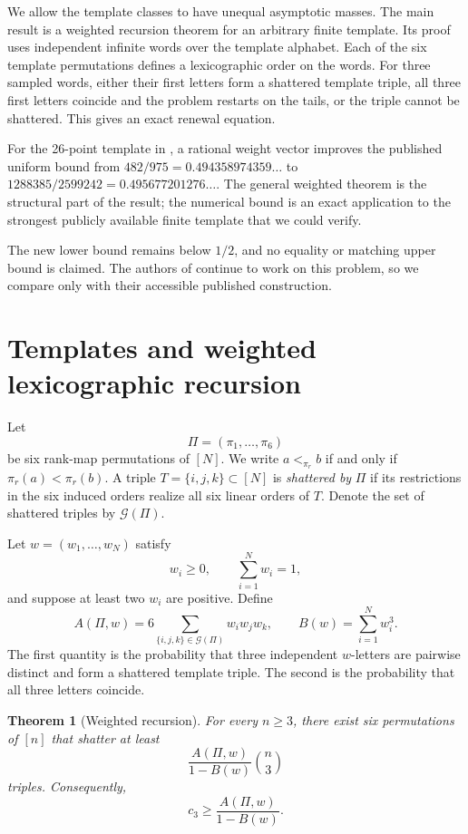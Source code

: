 \documentclass[11pt]{article}
\newtheorem{theorem}{Theorem}[section]
\newcommand{\shat}{\mathcal{G}}
\begin{document}
We allow the template classes to have unequal asymptotic masses.  The main
result is a weighted recursion theorem for an arbitrary finite template.  Its
proof uses independent infinite words over the template alphabet.  Each of
the six template permutations defines a lexicographic order on the words.
For three sampled words, either their first letters form a shattered template
triple, all three first letters coincide and the problem restarts on the
tails, or the triple cannot be shattered.  This gives an exact renewal
equation.

For the 26-point template in \cite{cerna-kielak-volec}, a rational weight
vector improves the published uniform bound from
$482/975=0.494358974359\ldots$ to
$1288385/2599242=0.495677201276\ldots$.  The general weighted theorem is the
structural part of the result; the numerical bound is an exact application to
the strongest publicly available finite template that we could verify.

The new lower bound remains below $1/2$, and no equality or matching upper
bound is claimed.  The authors of \cite{cerna-kielak-volec} continue to work
on this problem, so we compare only with their accessible published
construction.

\section{Templates and weighted lexicographic recursion}

Let
\[
\Pi=(\pi_1,\ldots,\pi_6)
\]
be six rank-map permutations of $[N]$.  We write
$a<_{\pi_r}b$ if and only if $\pi_r(a)<\pi_r(b)$.  A triple
$T=\{i,j,k\}\subset[N]$ is \emph{shattered by} $\Pi$ if its restrictions in
the six induced orders realize all six linear orders of $T$.  Denote the set of shattered triples by
$\shat(\Pi)$.

Let $w=(w_1,\ldots,w_N)$ satisfy
\[
w_i\ge0,
\qquad \sum_{i=1}^Nw_i=1,
\]
and suppose at least two $w_i$ are positive.  Define
\[
A(\Pi,w)=6\sum_{\{i,j,k\}\in\shat(\Pi)}w_iw_jw_k,
\qquad
B(w)=\sum_{i=1}^Nw_i^3.
\]
The first quantity is the probability that three independent $w$-letters
are pairwise distinct and form a shattered template triple.  The second is
the probability that all three letters coincide.

\begin{theorem}[Weighted recursion]\label{thm:weighted}
For every $n\ge3$, there exist six permutations of $[n]$ that shatter at
least
\[
\frac{A(\Pi,w)}{1-B(w)}\binom n3
\]
triples.  Consequently,
\[
\boxed{c_3\ge\frac{A(\Pi,w)}{1-B(w)}}.
\]
\end{theorem}
\end{document}
